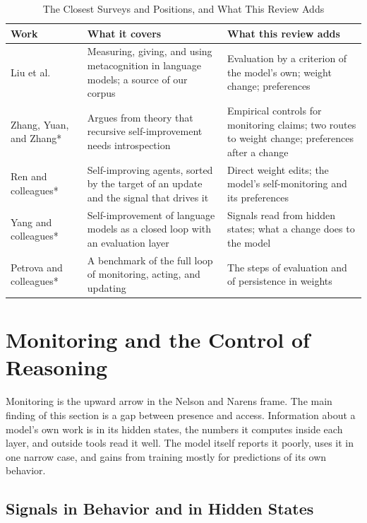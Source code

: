 \documentclass[journal]{IEEEtran}
\begin{document}
\begin{table}[!t]
\caption{The Closest Surveys and Positions, and What This Review Adds}\label{tab:2}
\centering\footnotesize\renewcommand{\arraystretch}{1.15}
\begin{tabularx}{\textwidth}{@{}>{\raggedright\arraybackslash}p{}>{\raggedright\arraybackslash}X>{\raggedright\arraybackslash}X@{}}
\toprule
\textbf{Work} & \textbf{What it covers} & \textbf{What this review adds} \\
\midrule
Liu et al.~\cite{Liu2026} & Measuring, giving, and using metacognition in language models; a source of our corpus & Evaluation by a criterion of the model's own; weight change; preferences \\
Zhang, Yuan, and Zhang*~\cite{Zhang2026} & Argues from theory that recursive self-improvement needs introspection & Empirical controls for monitoring claims; two routes to weight change; preferences after a change \\
Ren and colleagues*~\cite{Ren2026} & Self-improving agents, sorted by the target of an update and the signal that drives it & Direct weight edits; the model's self-monitoring and its preferences \\
Yang and colleagues*~\cite{Yang2026} & Self-improvement of language models as a closed loop with an evaluation layer & Signals read from hidden states; what a change does to the model \\
Petrova and colleagues*~\cite{Petrova2026} & A benchmark of the full loop of monitoring, acting, and updating & The steps of evaluation and of persistence in weights \\
\bottomrule
\end{tabularx}
\end{table}


\section{Monitoring and the Control of Reasoning}\label{sec:3}

Monitoring is the upward arrow in the Nelson and Narens frame. The main finding of this section is a gap between presence and access. Information about a model's own work is in its hidden states, the numbers it computes inside each layer, and outside tools read it well. The model itself reports it poorly, uses it in one narrow case, and gains from training mostly for predictions of its own behavior.

\subsection{Signals in Behavior and in Hidden States}\label{sec:3.1}
\end{document}
